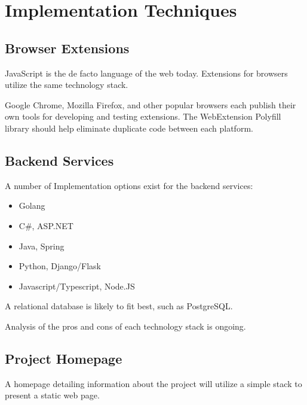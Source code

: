 \documentclass[proposal.tex]{subfiles}
\begin{document}
    
\section{Implementation Techniques}

\subsection*{Browser Extensions}

JavaScript is the de facto language of the web today.
Extensions for browsers utilize the same technology stack.

Google Chrome, Mozilla Firefox, and other popular browsers each publish their own tools for developing and testing extensions.
The WebExtension Polyfill library should help eliminate duplicate code between each platform.


\subsection*{Backend Services}

A number of Implementation options exist for the backend services:

\begin{itemize}
    \item Golang 
    \item C\#, ASP.NET
    \item Java, Spring
    \item Python, Django/Flask
    \item Javascript/Typescript, Node.JS
\end{itemize}

A relational database is likely to fit best, such as PostgreSQL.

Analysis of the pros and cons of each technology stack is ongoing.


\subsection*{Project Homepage}

A homepage detailing information about the project will utilize a simple stack to present a static web page.
\end{document}
